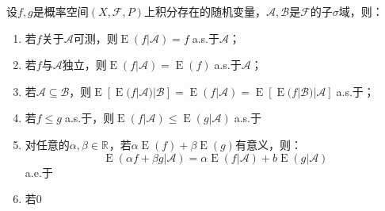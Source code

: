 \begin{theorem}
	设$f,g$是概率空间$(X,\mathscr{F},P)$上积分存在的随机变量，$\mathscr{A},\mathscr{B}$是$\mathscr{F}$的子$\sigma$域，则：
	\begin{enumerate}
		\item 若$f$关于$\mathscr{A}$可测，则$\operatorname{E}(f|\mathscr{A})=f\;$a.s.于$\mathscr{A}$；
		\item 若$f$与$\mathscr{A}$独立，则$\operatorname{E}(f|\mathscr{A})=\operatorname{E}(f)\;$a.s.于$\mathscr{A}$；
		\item 若$\mathscr{A}\subseteq\mathscr{B}$，则$\operatorname{E}[\operatorname{E}(f|\mathscr{A})|\mathscr{B}]=\operatorname{E}(f|\mathscr{A})=\operatorname{E}[\operatorname{E}(f|\mathscr{B})|\mathscr{A}]\;$a.s.于；
		\item 若$f\leqslant g\;$a.s.于，则$\operatorname{E}(f|\mathscr{A})\leqslant\operatorname{E}(g|\mathscr{A})\;$a.s.于
		\item 对任意的$\alpha,\beta\in\mathbb{R}^{}$，若$\alpha\operatorname{E}(f)+\beta\operatorname{E}(g)$有意义，则：
		\begin{equation*}
			\operatorname{E}(\alpha f+\beta g|\mathscr{A})=\alpha\operatorname{E}(f|\mathscr{A})+b\operatorname{E}(g|\mathscr{A})
		\end{equation*}
		a.e.于
		\item 若$0$
	\end{enumerate}
\end{theorem}
